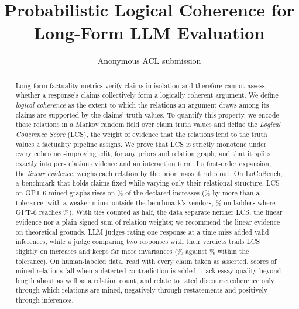 \documentclass[11pt]{article}
\title{Probabilistic Logical Coherence for Long-Form LLM Evaluation}
\author{Anonymous ACL submission}
\theoremstyle{definition}
\theoremstyle{remark}
\begin{document}
\maketitle

\begin{abstract}
  Long-form factuality metrics verify claims in isolation and therefore
  cannot assess whether a response's claims collectively form a logically coherent argument.
  We define \emph{logical coherence} as the extent to which the relations an argument
  draws among its claims are supported by the claims' truth values. To quantify this property,
  we encode these relations in a Markov random field over claim truth values and define the
  \emph{Logical Coherence Score} (LCS), the weight of evidence that the relations lend to the truth
  values a factuality pipeline assigns.
  We prove that LCS is strictly monotone under every coherence-improving edit, for any priors and
  relation graph, and that it splits exactly into per-relation evidence and an interaction term. Its first-order expansion, the \emph{linear evidence}, weighs each relation by the prior mass it
  rules out. On LoCoBench, a benchmark that holds claims fixed while varying only their
  relational structure, LCS on GPT-6-mined graphs rises on \sThreeGraphGptLamIncPct\% of the
  declared increases (\sThreeGraphGptLamIncTolPct\% by more than a tolerance; with a weaker miner
  outside the benchmark's vendors, \subLlamaLcsInc\% on ladders where GPT-6 reaches \subGptLcsInc\%).
  With ties counted as half, the data separate neither LCS, the linear evidence nor a plain signed sum
  of relation weights; we recommend the linear evidence on theoretical grounds. LLM judges rating one response at a time miss added valid inferences, while a judge comparing two
  responses with their verdicts trails LCS slightly on increases and keeps far more invariances
  (\fjPairVInvTie\% against \sThreeGraphGptLamInvTolPct\% within the tolerance). On human-labeled data, read with every claim taken as asserted, scores of
  mined relations fall when a detected contradiction is added, track essay quality beyond length
  about as well as a relation count, and relate to rated discourse coherence only through which
  relations are mined, negatively through restatements and positively through inferences.
\end{abstract}










\appendix










\end{document}
